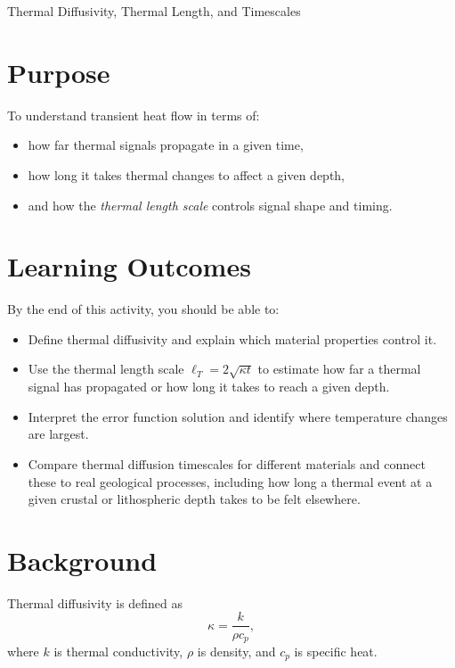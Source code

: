 \begin{activity}{Thermal Diffusivity, Thermal Length, and Timescales}

\section*{Purpose}
To understand transient heat flow in terms of:
\begin{itemize}
  \item how far thermal signals propagate in a given time,
  \item how long it takes thermal changes to affect a given depth,
  \item and how the \emph{thermal length scale} controls signal shape and timing.
\end{itemize}

\section*{Learning Outcomes}

By the end of this activity, you should be able to:
\begin{itemize}
  \item Define thermal diffusivity and explain which material properties control it.
  \item Use the thermal length scale $\ell_T = 2\sqrt{\kappa t}$ to estimate how far a thermal signal has propagated or how long it takes to reach a given depth.
  \item Interpret the error function solution and identify where temperature changes are largest.
  \item Compare thermal diffusion timescales for different materials and connect these to real geological processes, including how long a thermal event at a given crustal or lithospheric depth takes to be felt elsewhere.
\end{itemize}

\section*{Background}
Thermal diffusivity is defined as
\[
\kappa = \frac{k}{\rho c_p},
\]
where $k$ is thermal conductivity, $\rho$ is density, and $c_p$ is specific heat.


\end{activity}
